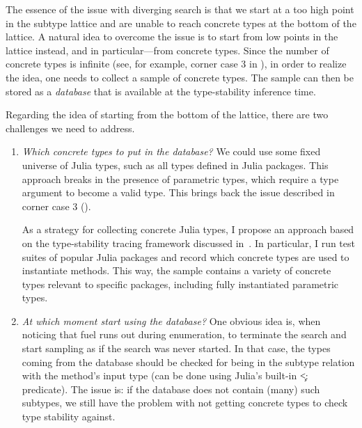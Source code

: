 The essence of the issue with diverging search is that we start at a too high
point in the subtype lattice and are unable to reach concrete types at the
bottom of the lattice. 
A natural idea to overcome the issue is to start from
low points in the lattice instead, and in particular---from concrete types.
Since the number of concrete types is infinite (see, for example,
corner case 3 in ),
in order to realize the idea, one needs to collect a sample of concrete types.
The sample can then be stored as a \emph{database} that is available at the
type-stability inference time.

Regarding the idea of starting from the bottom of the lattice, there are two
challenges we need to address.

\begin{enumerate}

  \item
  \emph{Which concrete types to put in the database?}
We could use some fixed universe of Julia types,
such as all types defined in Julia packages. This approach breaks in the
presence of parametric types, which require a type argument to become a valid
type. This brings back the issue described in
corner case 3 ().

As a strategy for collecting concrete Julia types, I propose an approach based
on the type-stability tracing framework discussed in~. In
particular, I run test suites of popular Julia packages and record which
concrete types are used to instantiate methods.
This way, the sample contains a variety of concrete types relevant to specific
packages, including fully instantiated parametric types.

  \item
  \emph{At which moment start using the database?} %
One obvious idea is, when noticing that fuel runs out during enumeration, to
terminate the search and start sampling as if the search was never started.
In that case, the types coming from the database should be checked for being
in the subtype relation with the method's input type (can be done
using Julia's built-in \c{<:} predicate). The issue is:
if the database does not contain (many) such subtypes,
we still have the problem with not getting concrete types to check type
stability against.


\end{enumerate}
